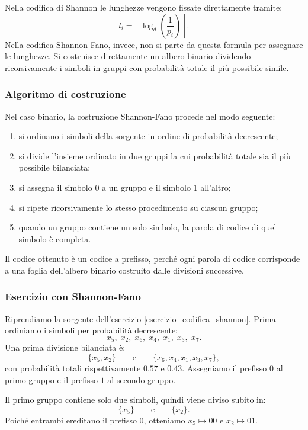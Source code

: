 \documentclass{article}
\theoremstyle{definition}
\numberwithin{equation}{section}
\begin{document}
Nella codifica di Shannon le lunghezze vengono fissate direttamente tramite:
\[
    l_i = \left\lceil \log_d\!\left(\frac{1}{p_i}\right) \right\rceil.
\]
Nella codifica Shannon-Fano, invece, non si parte da questa formula per assegnare le lunghezze. Si costruisce direttamente un albero binario dividendo ricorsivamente i simboli in gruppi con probabilità totale il più possibile simile.

\subsubsection{Algoritmo di costruzione}
Nel caso binario, la costruzione Shannon-Fano procede nel modo seguente:
\begin{enumerate}
    \item si ordinano i simboli della sorgente in ordine di probabilità decrescente;
    \item si divide l'insieme ordinato in due gruppi la cui probabilità totale sia il più possibile bilanciata;
    \item si assegna il simbolo $0$ a un gruppo e il simbolo $1$ all'altro;
    \item si ripete ricorsivamente lo stesso procedimento su ciascun gruppo;
    \item quando un gruppo contiene un solo simbolo, la parola di codice di quel simbolo è completa.
\end{enumerate}

Il codice ottenuto è un codice a prefisso, perché ogni parola di codice corrisponde a una foglia dell'albero binario costruito dalle divisioni successive.

\subsubsection{Esercizio con Shannon-Fano}
Riprendiamo la sorgente dell'esercizio \eqref{esercizio_codifica_shannon}. Prima ordiniamo i simboli per probabilità decrescente:
\[
    x_5,\; x_2,\; x_6,\; x_4,\; x_1,\; x_3,\; x_7.
\]
Una prima divisione bilanciata è:
\[
    \{x_5,x_2\}
    \qquad\text{e}\qquad
    \{x_6,x_4,x_1,x_3,x_7\},
\]
con probabilità totali rispettivamente $0.57$ e $0.43$. Assegniamo il prefisso $0$ al primo gruppo e il prefisso $1$ al secondo gruppo.

Il primo gruppo contiene solo due simboli, quindi viene diviso subito in:
\[
    \{x_5\}
    \qquad\text{e}\qquad
    \{x_2\}.
\]
Poiché entrambi ereditano il prefisso $0$, otteniamo $x_5 \mapsto 00$ e $x_2 \mapsto 01$.
\end{document}
